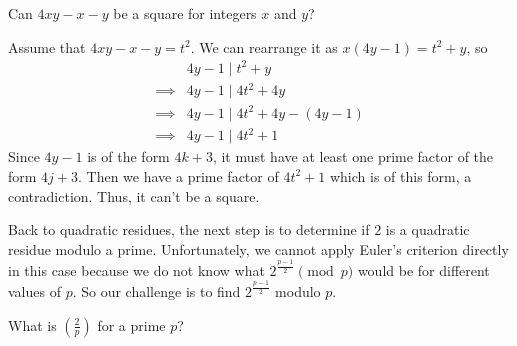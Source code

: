 \begin{problem}
	Can $4xy-x-y$ be a square for integers $x$ and $y$?
\end{problem}

\begin{solution}
	Assume that $4xy-x-y=t^2$. We can rearrange it as $x(4y-1)  = t^2+y$, so
		\begin{align*}
			&4y-1  \mid t^2+y\\
			\implies &4y-1  \mid 4t^2+4y\\
			\implies &4y-1  \mid 4t^2+4y-(4y-1)\\
			\implies &4y-1  \mid 4t^2+1
		\end{align*}
	Since $4y-1$ is of the form $4k+3$, it must have at least one prime factor of the form $4j+3$. Then we have a prime factor of $4t^2+1$ which is of this form, a contradiction. Thus, it can't be a square.
\end{solution}
Back to quadratic residues, the next step is to determine if $2$ is a quadratic residue modulo a prime. Unfortunately, we cannot apply Euler's criterion directly in this case because we do not know what $2^\frac{p-1}{2} \pmod p$ would be for different values of $p$. So our challenge is to find $2^\frac{p-1}{2}$ modulo $p$.

\begin{problem}\label{pr:qr2p}
	What is $ \left(\frac{2}{p}\right)$ for a prime $p$?
\end{problem}


